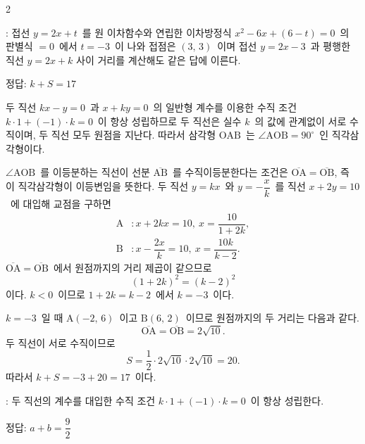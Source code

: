 \documentclass[10pt,fleqn]{article}
\begin{document}
\begin{multicols*}{2}
\begin{dmcriticalpoint}
: 접선 $y = 2x + t$\ 를 원 이차함수와 연립한 이차방정식 $x^2 - 6x + (6 - t) = 0$\ 의 판별식 $=0$\ 에서 $t = -3$\ 이 나와 접점은 $(3,\, 3)$\ 이며 접선 $y = 2x - 3$\ 과 평행한 직선 $y = 2x + k$ 사이 거리를 계산해도 같은 답에 이른다.
\end{dmcriticalpoint}

\begin{dmanswerbox}
정답: $k+S=17$
\end{dmanswerbox}

두 직선 $kx - y = 0$\ 과 $x + ky = 0$\ 의 일반형 계수를 이용한 수직 조건 $k \cdot 1 + (-1) \cdot k = 0$\ 이 항상 성립하므로 두 직선은 실수 $k$\ 의 값에 관계없이 서로 수직이며, 두 직선 모두 원점을 지난다. 따라서 삼각형 $\mathrm{OAB}$\ 는 $\angle\mathrm{AOB} = 90^{\circ}$\ 인 직각삼각형이다.

$\angle\mathrm{AOB}$\ 를 이등분하는 직선이 선분 $\overline{\mathrm{AB}}$\ 를 수직이등분한다는 조건은 $\overline{\mathrm{OA}} = \overline{\mathrm{OB}}$, 즉 이 직각삼각형이 이등변임을 뜻한다. 두 직선 $y = kx$\ 와 $y = -\dfrac{x}{k}$\ 를 직선 $x + 2y = 10$\ 에 대입해 교점을 구하면
\begin{align*}
  \mathrm{A} &: x + 2kx = 10,\ x = \dfrac{10}{1+2k},\\
  \mathrm{B} &: x - \dfrac{2x}{k} = 10,\ x = \dfrac{10k}{k-2}.
\end{align*}
$\overline{\mathrm{OA}} = \overline{\mathrm{OB}}$\ 에서 원점까지의 거리 제곱이 같으므로
\[ (1+2k)^2 = (k-2)^2 \]
이다. $k < 0$\ 이므로 $1 + 2k = k - 2$\ 에서 $k = -3$\ 이다.

$k = -3$\ 일 때 $\mathrm{A}(-2,\, 6)$\ 이고 $\mathrm{B}(6,\, 2)$\ 이므로 원점까지의 두 거리는 다음과 같다.
\[ \overline{\mathrm{OA}} = \overline{\mathrm{OB}} = 2\sqrt{10}. \]
두 직선이 서로 수직이므로
\[ S = \dfrac{1}{2} \cdot 2\sqrt{10} \cdot 2\sqrt{10} = 20. \]
따라서 $k + S = -3 + 20 = 17$\ 이다.

\begin{dmcriticalpoint}
: 두 직선의 계수를 대입한 수직 조건 $k \cdot 1 + (-1) \cdot k = 0$\ 이 항상 성립한다.
\end{dmcriticalpoint}

\begin{dmanswerbox}
정답: $a+b=\dfrac{9}{2}$
\end{dmanswerbox}


\end{multicols*}
\end{document}
